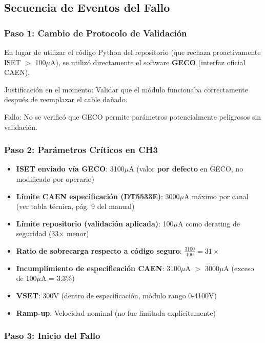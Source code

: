 \documentclass{article}
\begin{document}
\subsection{Secuencia de Eventos del Fallo}

\subsubsection{Paso 1: Cambio de Protocolo de Validación}

En lugar de utilizar el código Python del repositorio (que rechaza proactivamente ISET $>$ 100\(\mu\)A), se utilizó directamente el software \textbf{GECO} (interfaz oficial CAEN).

Justificación en el momento: Validar que el módulo funcionaba correctamente después de reemplazar el cable dañado.

Fallo: No se verificó que GECO permite parámetros potencialmente peligrosos sin validación.

\subsubsection{Paso 2: Parámetros Críticos en CH3}

\begin{itemize}
    \item \textbf{ISET enviado vía GECO}: 3100\(\mu\)A (valor \textbf{por defecto} en GECO, no modificado por operario)
    \item \textbf{Límite CAEN especificación (DT5533E)}: 3000\(\mu\)A máximo por canal (ver tabla técnica, pág. 9 del manual)
    \item \textbf{Límite repositorio (validación aplicada)}: 100\(\mu\)A como derating de seguridad (33× menor)
    \item \textbf{Ratio de sobrecarga respecto a código seguro}: \(\frac{3100}{100} = 31\times\)
    \item \textbf{Incumplimiento de especificación CAEN}: 3100\(\mu\)A $>$ 3000\(\mu\)A (exceso de 100\(\mu\)A = 3.3\%)
    \item \textbf{VSET}: 300V (dentro de especificación, módulo rango 0-4100V)
    \item \textbf{Ramp-up}: Velocidad nominal (no fue limitada explícitamente)
\end{itemize}

\subsubsection{Paso 3: Inicio del Fallo}
\end{document}
